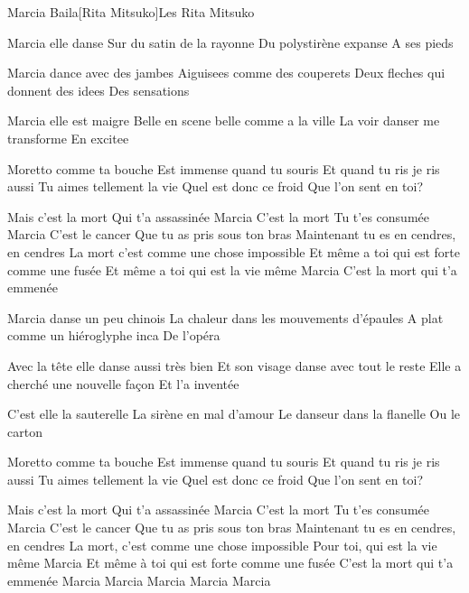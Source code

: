 \documentclass[a4paper,11pt,french]{article}
\begin{document}
\begin{Song}{Marcia Baila}[Rita Mitsuko]{Les Rita Mitsuko}
\begin{multicols}{2}

\begin{Verse}
Marcia elle danse
Sur du satin de la rayonne
Du polystirène expanse
A ses pieds
\espaceInterStrophe

Marcia dance avec des jambes
Aiguisees comme des couperets
Deux fleches qui donnent des idees
Des sensations
\espaceInterStrophe

Marcia elle est maigre
Belle en scene belle comme a la ville
La voir danser me transforme
En excitee
\end{Verse}
\espaceInterStrophe

\begin{PreChorus}
Moretto comme ta bouche
Est immense quand tu souris
Et quand tu ris je ris aussi
Tu aimes tellement la vie
Quel est donc ce froid
Que l'on sent en toi?
\end{PreChorus}
\espaceInterStrophe

\begin{Chorus}
Mais c'est la mort
Qui t'a assassinée Marcia
C'est la mort
Tu t'es consumée Marcia
C'est le cancer
Que tu as pris sous ton bras
Maintenant tu es en cendres, en cendres
La mort c'est comme une chose impossible
Et même a toi qui est forte comme une fusée
Et même a toi qui est la vie même Marcia
C'est la mort qui t'a emmenée
\end{Chorus}
\vfill
\columnbreak

\begin{Verse}
Marcia danse un peu chinois
La chaleur dans les mouvements d'épaules
A plat comme un hiéroglyphe inca
De l'opéra
\espaceInterStrophe

Avec la tête elle danse aussi très bien
Et son visage danse avec tout le reste
Elle a cherché une nouvelle façon
Et l'a inventée
\espaceInterStrophe

C'est elle la sauterelle
La sirène en mal d'amour
Le danseur dans la flanelle
Ou le carton
\end{Verse}
\espaceInterStrophe

\begin{PreChorus}
Moretto comme ta bouche
Est immense quand tu souris
Et quand tu ris je ris aussi
Tu aimes tellement la vie
Quel est donc ce froid
Que l'on sent en toi?
\end{PreChorus}
\espaceInterStrophe

\begin{Chorus}
Mais c'est la mort
Qui t'a assassinée Marcia
C'est la mort
Tu t'es consumée Marcia
C'est le cancer
Que tu as pris sous ton bras
Maintenant tu es en cendres, en cendres
La mort, c'est comme une chose impossible
Pour toi, qui est la vie même Marcia
Et même à toi qui est forte comme une fusée
C'est la mort qui t'a emmenée
Marcia Marcia Marcia Marcia Marcia
\end{Chorus}
\end{multicols}


\end{Song}
\end{document}
